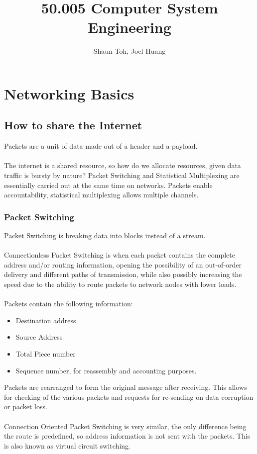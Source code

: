 \documentclass{article}
\title{50.005 Computer System Engineering}
\author{Shaun Toh, Joel Huang}
\begin{document}
\maketitle

\section{Networking Basics}
\subsection{How to share the Internet}
Packets are a unit of data made out of a header and a payload.\\\\
The internet is a shared resource, so how do we allocate resources, given data traffic is bursty by nature? Packet Switching and Statistical Multiplexing are essentially carried out at the same time on networks. Packets enable accountability, statistical multiplexing allows multiple channels.

\subsubsection{Packet Switching}
Packet Switching is breaking data into blocks instead of a stream.\\\\
Connectionless Packet Switching is when each packet contains the complete address and/or routing information, opening the possibility of an out-of-order delivery and different paths of transmission, while also possibly increasing the speed due to the ability to route packets to network nodes with lower loads.\\\\
Packets contain the following information:
\begin{itemize}
\item Destination address
\item Source Address
\item Total Piece number
\item Sequence number, for reassembly and accounting purposes.
\end{itemize}
Packets are rearranged to form the original message after receiving. This allows for checking of the various packets and requests for re-sending on data corruption or packet loss.\\\\ 
Connection Oriented Packet Switching is very similar, the only difference being the route is predefined, so address information is not sent with the packets. This is also known as virtual circuit switching.\\
\par 
\end{document}
